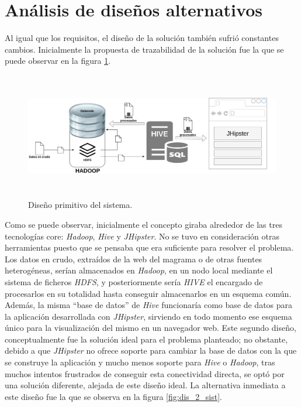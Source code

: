 \section{Análisis de diseños alternativos} \label{c.analisis.disenyos}

Al igual que los requisitos, el diseño de la solución también sufrió constantes cambios. Inicialmente la propuesta de trazabilidad de la solución fue la que se puede observar en la figura \ref{fig:dis_1_sist}. \par

\begin{figure}[H]
    \centering
    \includegraphics[width=1\textwidth,height=5.5cm]{Imagenes/Dis_Fig_1}
    \caption{Diseño primitivo del sistema.}
    \label{fig:dis_1_sist}
\end{figure}
\par


Como se puede observar, inicialmente el concepto giraba alrededor de las tres tecnologías core: \textit{Hadoop}, \textit{Hive} y \textit{JHipster}. No se tuvo en consideración otras herramientas puesto que se pensaba que era suficiente para resolver el problema. Los datos en crudo, extraídos de la web del magrama o de otras fuentes heterogéneas, serían almacenados en \textit{Hadoop}, en un nodo local mediante el sistema de ficheros \textit{HDFS}, y posteriormente sería \textit{HIVE} el encargado de procesarlos en su totalidad hasta conseguir almacenarlos en un esquema común. Además, la misma “base de datos” de \textit{Hive} funcionaría como base de datos para la aplicación desarrollada con \textit{JHipster}, sirviendo en todo momento ese esquema único para la visualización del mismo en un navegador web. Este segundo diseño, conceptualmente fue la solución ideal para el problema planteado; no obstante, debido a que \textit{JHipster} no ofrece soporte para cambiar la base de datos con la que se construye la aplicación y mucho menos soporte para \textit{Hive} o \textit{Hadoop}, tras muchos intentos frustrados de conseguir esta conectividad directa, se optó por una solución diferente, alejada de este diseño ideal. La alternativa inmediata a este diseño fue la que se observa en la figura \ref{fig:dis_2_sist}. \par


